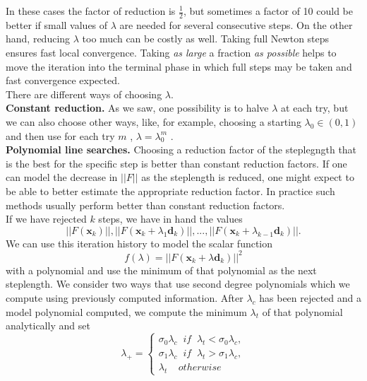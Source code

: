   In these cases the factor of reduction is $\frac{1}{2}$, but sometimes a factor of 10 could be better if small values of $\lambda$ are needed for several consecutive steps. On the other hand, reducing $\lambda$ too much can be costly as well. Taking full Newton steps ensures fast local convergence. Taking \textit{as large} a fraction \textit{as
  possible} helps to move the iteration into the terminal phase in which full steps
  may be taken and fast convergence expected.\\
  There are different ways of choosing $\lambda$.\\
  \noindent\textbf{Constant reduction.} As we saw, one possibility is to halve $\lambda$ at each try, but we can also choose other ways, like, for example, choosing a starting $\lambda_0 \in (0,1)$ and then use for each try $m$ , $\lambda = \lambda_0^m$ .\\
  \noindent\textbf{Polynomial line searches.} Choosing a reduction factor of the steplegngth that is the best for the specific step is better than constant reduction factors. If one can model the decrease
  in $||F||$ as the steplength is reduced, one might expect to be able to better
  estimate the appropriate reduction factor.
  In practice such methods usually
  perform better than constant reduction factors.\\
  If we have rejected $k$ steps, we have in hand the values
  \begin{equation*}
  ||F(\textbf{x}_k)||,||F(\textbf{x}_k+\lambda_1\textbf{d}_k)||,...,||F(\textbf{x}_k+\lambda_{k-1}\textbf{d}_k)||.
  \end{equation*}
  We can use this iteration history to model the scalar function
	  \begin{equation*}
	  f(\lambda)=||F(\textbf{x}_k + \lambda \textbf{d}_k)||^2
	  \end{equation*}
	  with a polynomial and use the minimum of that polynomial as the next steplength.
  We consider two ways that use second degree polynomials which we compute using previously computed information. After $\lambda_c$  has been rejected and a model polynomial computed, we compute the minimum $\lambda_t$ of that polynomial analytically and set
  \begin{equation}
  \lambda_+={
  	\begin{cases}
  	\label{lambda+}
  	\sigma_0\lambda_c \; \; if \; \; \lambda_t<\sigma_0\lambda_c, \\
  	\sigma_1\lambda_c \; \; if \; \; \lambda_t>\sigma_1\lambda_c,\\
  	\lambda_t \; \; \; \; otherwise
  	
  	\end{cases}}
  \end{equation}
